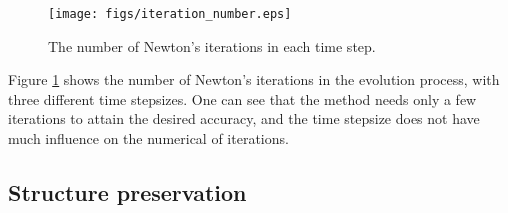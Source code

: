 \documentclass[review]{elsarticle}
\begin{document}
\begin{table}[hbt!]
\begin{center}
\caption{Convergence rates in the $L^\infty$ norm, with $h_0 = 1/8$ and $\tau_0 = 0.04$. The initial curve is an ellipse $x^2+4y^2=4$.}\label{tab:newton}
\end{center}
\end{table}

\begin{figure}[htp!]
    \centering
    \texttt{[image: figs/iteration\_number.eps]}
    \vspace{-5pt}
    \caption{The number of Newton's iterations in each time step.} \label{fig:iteration_number}
\end{figure}

Figure \ref{fig:iteration_number} shows the number of Newton's iterations in the evolution process, with three different time stepsizes. One can see that the method needs only a few iterations to attain the desired accuracy, and the time stepsize does not have much influence on the numerical of iterations.


\subsection{Structure preservation}
%
\end{document}
